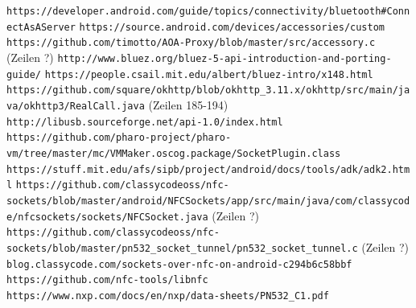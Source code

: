 \documentclass[12pt,a4paper]{article}
\begin{document}
    \renewcommand\refname{Internetquellen}
    \begin{thebibliography}{9}
        \texttt{https://developer.android.com/guide/topics/\linebreak connectivity/bluetooth\#ConnectAsAServer}
        \texttt{https://source.android.com/devices/\linebreak accessories/custom}
        \texttt{https://github.com/timotto/AOA-Proxy/blob/\linebreak master/src/accessory.c} (Zeilen ?)
        \texttt{http://www.bluez.org/bluez-5-api-introduction-and-\linebreak porting-guide/}
        \texttt{https://people.csail.mit.edu/albert/bluez-intro/x148.html}
        \texttt{https://github.com/square/okhttp/blob/okhttp\_3.11.x/\linebreak okhttp/src/main/java/okhttp3/RealCall.java} (Zeilen 185-194)
        \texttt{http://libusb.sourceforge.net/api-1.0/index.html}
        \texttt{https://github.com/pharo-project/pharo-vm/tree/\linebreak master/mc/VMMaker.oscog.package/SocketPlugin.class}
        \texttt{https://stuff.mit.edu/afs/sipb/project/android/docs/tools/\linebreak adk/adk2.html}
        \texttt{https://github.com/classycodeoss/nfc-sockets/blob/\linebreak master/android/NFCSockets/app/src/main/java/com/classycode/\linebreak nfcsockets/sockets/NFCSocket.java} (Zeilen ?)
        \texttt{https://github.com/classycodeoss/nfc-sockets/blob/\linebreak master/pn532\_socket\_tunnel/pn532\_socket\_tunnel.c} (Zeilen ?)
        \texttt{blog.classycode.com/sockets-over-nfc-on-\linebreak android-c294b6c58bbf}
        \texttt{https://github.com/nfc-tools/libnfc}
        \texttt{https://www.nxp.com/docs/en/nxp/data-sheets/\linebreak PN532\_C1.pdf}
    \end{thebibliography}
    \pagebreak
    \appendix
    \stopcontents
\end{document}
